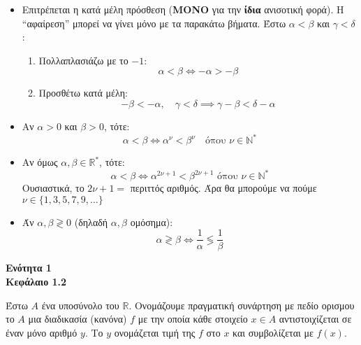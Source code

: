 \documentclass[a4paper,12pt]{article}
\begin{document}
\begin{itemize}[leftmargin=1em]
\begin{itemize}
        \item Επιτρέπεται η κατά μέλη πρόσθεση (\textbf{ΜΟΝΟ} για την \textbf{ίδια} ανισοτική φορά).
        Η ``αφαίρεση'' μπορεί να γίνει μόνο με τα παρακάτω βήματα. Έστω $\alpha < \beta$ και $\gamma < \delta$:

        \begin{enumerate}
            \item Πολλαπλασιάζω με το $-1$:
            \[
            \alpha < \beta \iff -\alpha > -\beta
            \]
            \item Προσθέτω κατά μέλη:
            \[
            -\beta < -\alpha, \quad \gamma < \delta \implies \gamma - \beta < \delta - \alpha
            \]
        \end{enumerate}

        \item Αν $\alpha > 0$ και $\beta > 0$, τότε:
        \[
        \alpha < \beta \iff \alpha^\nu < \beta^\nu \quad \text{όπου } \nu \in \mathbb{N}^*
        \]

        \item Αν όμως $\alpha, \beta \in \mathbb{R}^*$, τότε:
        \[
        \alpha < \beta \iff \alpha^{2\nu + 1} < \beta^{2\nu + 1} \text{ όπου } \nu \in \mathbb{N}^*
        \]
        Ουσιαστικά, το $2\nu + 1 =$ περιττός αριθμός. Άρα θα μπορούμε να πούμε $\nu \in \{1,3,5,7,9,\ldots\}$ %
        \item Άν $\alpha, \beta \gtrless 0$ (δηλαδή $\alpha,\beta$ ομόσημα):
        \[
        \alpha \gtrless \beta \iff \frac{1}{\alpha} \lessgtr \frac{1}{\beta}
        \]


    \end{itemize}

\end{itemize}

\newpage

\begin{center}
    \LARGE \textbf{Ενότητα 1}\\[1ex]
    \Large \textbf{Κεφάλαιο 1.2}\\
\end{center}

\begin{tcolorbox}[colback=blue!10!white, colframe=blue!50!black, title=Ορισμός Συνάρτησης]
Έστω $A$ ένα υποσύνολο του $\mathbb{R}$. Ονομάζουμε πραγματική συνάρτηση με πεδίο ορισμου το $A$ μια διαδικασία (κανόνα) $f$ με την οποία κάθε στοιχείο $x\in A$ αντιστοιχίζεται σε έναν μόνο αριθμό $y$. Το $y$ ονομάζεται τιμή της $f$ στο $x$ και συμβολίζεται με $f(x)$.
\end{tcolorbox}
\end{document}
